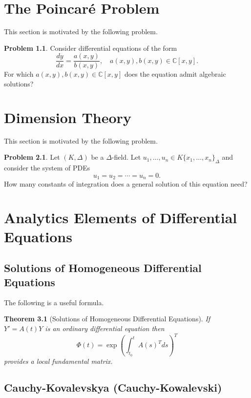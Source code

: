 \documentclass[12pt]{book}
\numberwithin{equation}{section}
\newtheorem{theorem}{Theorem}[subsection]
\theoremstyle{definition}
\newtheorem{problem}[theorem]{Problem}
\theoremstyle{remark}
\newcommand{\CC}{\mathbb{C}}
\begin{document}
\chapter[Poincar\'e Problem]{The Poincar\'e Problem}

This section is motivated by the following problem.
\begin{problem}
	Consider differential equations of the form
	 $$ \dfrac{dy}{dx} = \frac{a(x,y)}{b(x,y)}, \quad a(x,y),b(x,y) \in \CC[x,y].$$
	 For which $a(x,y),b(x,y) \in \CC[x,y]$ does the equation admit algebraic solutions?
\end{problem}


\chapter[Dimension Theory]{Dimension Theory}\label{S:dimension-theory}

This section is motivated by the following problem.
\begin{problem}
	Let $(K,\Delta)$ be a $\Delta$-field. 
	Let $u_1,\ldots,u_n \in K\lbrace x_1,\ldots,x_n\rbrace_{\Delta}$ and consider the system of PDEs
	 $$ u_1=u_2=\cdots=u_n=0. $$
	How many constants of integration does a general solution of this equation need?
\end{problem}

\appendix 
\chapter[Analytic Elements]{Analytics Elements of Differential Equations}

\section{Solutions of Homogeneous Differential Equations}
The following is a useful formula.
\begin{theorem}[Solutions of Homogeneous Differential Equations]\label{T:solutions}
	If $Y'= A(t)Y$ is an ordinary differential equation then 
	 $$ \Phi(t) = \exp( \int_{t_0}^t A(s)^T ds )^T $$
	provides a local fundamental matrix. 
\end{theorem}



\section{Cauchy-Kovalevskya (Cauchy-Kowalevski)}

\backmatter





\end{document}
